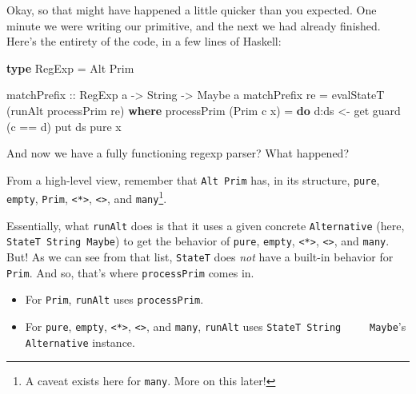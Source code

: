 \documentclass[]{article}
\newenvironment{Shaded}{}{}
\newcommand{\DataTypeTok}[1]{\textcolor[rgb]{0.56,0.13,0.00}{#1}}
\newcommand{\FunctionTok}[1]{\textcolor[rgb]{0.02,0.16,0.49}{#1}}
\newcommand{\KeywordTok}[1]{\textcolor[rgb]{0.00,0.44,0.13}{\textbf{#1}}}
\newcommand{\NormalTok}[1]{#1}
\newcommand{\OperatorTok}[1]{\textcolor[rgb]{0.40,0.40,0.40}{#1}}
\newcommand{\OtherTok}[1]{\textcolor[rgb]{0.00,0.44,0.13}{#1}}
\begin{document}
Okay, so that might have happened a little quicker than you expected. One minute
we were writing our primitive, and the next we had already finished. Here's the
entirety of the code, in a few lines of Haskell:

\begin{Shaded}
\begin{Highlighting}[]
\KeywordTok{type} \DataTypeTok{RegExp} \OtherTok{=} \DataTypeTok{Alt} \DataTypeTok{Prim}

\OtherTok{matchPrefix ::} \DataTypeTok{RegExp}\NormalTok{ a }\OtherTok{{-}\textgreater{}} \DataTypeTok{String} \OtherTok{{-}\textgreater{}} \DataTypeTok{Maybe}\NormalTok{ a}
\NormalTok{matchPrefix re }\OtherTok{=}\NormalTok{ evalStateT (runAlt processPrim re)}
  \KeywordTok{where}
\NormalTok{    processPrim (}\DataTypeTok{Prim}\NormalTok{ c x) }\OtherTok{=} \KeywordTok{do}
\NormalTok{      d}\OperatorTok{:}\NormalTok{ds }\OtherTok{\textless{}{-}}\NormalTok{ get}
\NormalTok{      guard (c }\OperatorTok{==}\NormalTok{ d)}
\NormalTok{      put ds}
      \FunctionTok{pure}\NormalTok{ x}
\end{Highlighting}
\end{Shaded}

And now we have a fully functioning regexp parser? What happened?

From a high-level view, remember that \texttt{Alt\ Prim} has, in its structure,
\texttt{pure}, \texttt{empty}, \texttt{Prim},
\texttt{\textless{}*\textgreater{}},
\texttt{\textless{}\textbar{}\textgreater{}}, and \texttt{many}\footnote{A
  caveat exists here for \texttt{many}. More on this later!}.

Essentially, what \texttt{runAlt} does is that it uses a given concrete
\texttt{Alternative} (here, \texttt{StateT\ String\ Maybe}) to get the behavior
of \texttt{pure}, \texttt{empty}, \texttt{\textless{}*\textgreater{}},
\texttt{\textless{}\textbar{}\textgreater{}}, and \texttt{many}. But! As we can
see from that list, \texttt{StateT} does \emph{not} have a built-in behavior for
\texttt{Prim}. And so, that's where \texttt{processPrim} comes in.

\begin{itemize}
\tightlist
\item
  For \texttt{Prim}, \texttt{runAlt} uses \texttt{processPrim}.
\item
  For \texttt{pure}, \texttt{empty}, \texttt{\textless{}*\textgreater{}},
  \texttt{\textless{}\textbar{}\textgreater{}}, and \texttt{many},
  \texttt{runAlt} uses \texttt{StateT\ String\ \ \ \ \ Maybe}'s
  \texttt{Alternative} instance.
\end{itemize}
\end{document}
